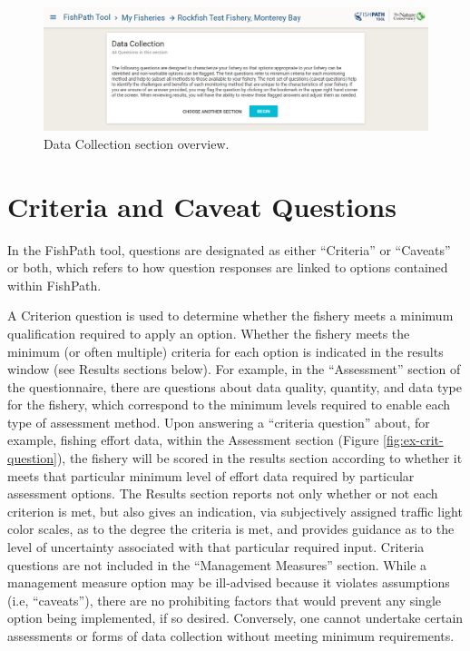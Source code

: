 \documentclass[
  11pt,
]{book}
\begin{document}
\begin{figure}

{\centering \includegraphics[width=0.95\linewidth]{images/dc-overview} 

}

\caption{Data Collection section overview.}\label{fig:dc-overview}
\end{figure}

\hypertarget{criteria-and-caveat-questions}{%
\section{Criteria and Caveat Questions}\label{criteria-and-caveat-questions}}

In the FishPath tool, questions are designated as either ``Criteria'' or ``Caveats'' or both, which refers to how question responses are linked to options contained within FishPath.

A Criterion question is used to determine whether the fishery meets a minimum qualification required to apply an option. Whether the fishery meets the minimum (or often multiple) criteria for each option is indicated in the results window (see Results sections below). For example, in the ``Assessment'' section of the questionnaire, there are questions about data quality, quantity, and data type for the fishery, which correspond to the minimum levels required to enable each type of assessment method. Upon answering a ``criteria question'' about, for example, fishing effort data, within the Assessment section (Figure \ref{fig:ex-crit-question}), the fishery will be scored in the results section according to whether it meets that particular minimum level of effort data required by particular assessment options. The Results section reports not only whether or not each criterion is met, but also gives an indication, via subjectively assigned traffic light color scales, as to the degree the criteria is met, and provides guidance as to the level of uncertainty associated with that particular required input. Criteria questions are not included in the ``Management Measures'' section. While a management measure option may be ill-advised because it violates assumptions (i.e, ``caveats''), there are no prohibiting factors that would prevent any single option being implemented, if so desired. Conversely, one cannot undertake certain assessments or forms of data collection without meeting minimum requirements.
\end{document}
